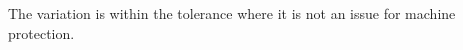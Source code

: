 \documentclass[a4paper]{cernatsnote}
\begin{document}
The variation is within the tolerance where it is not an issue for machine protection. 

\end{document}
